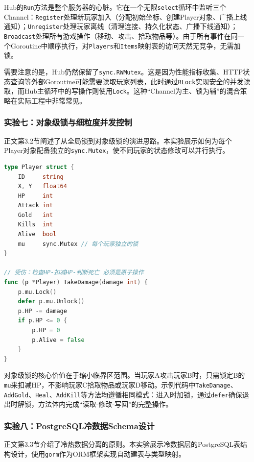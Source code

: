 Hub的\texttt{Run}方法是整个服务器的心脏。它在一个无限\texttt{select}循环中监听三个Channel：\texttt{Register}处理新玩家加入（分配初始坐标、创建Player对象、广播上线通知）；\texttt{Unregister}处理玩家离线（清理连接、持久化状态、广播下线通知）；\texttt{Broadcast}处理所有游戏操作（移动、攻击、拾取物品等）。由于所有事件在同一个Goroutine中顺序执行，对\texttt{Players}和\texttt{Items}映射表的访问天然无竞争，无需加锁。

需要注意的是，Hub仍然保留了\texttt{sync.RWMutex}。这是因为性能指标收集、HTTP状态查询等外部Goroutine可能需要读取玩家列表，此时通过\texttt{RLock}实现安全的并发读取，而Hub主循环中的写操作则使用\texttt{Lock}。这种``Channel为主、锁为辅''的混合策略在实际工程中非常常见。

\subsubsection{实验七：对象级锁与细粒度并发控制}

正文第3.2节阐述了从全局锁到对象级锁的演进思路。本实验展示如何为每个Player对象配备独立的\texttt{sync.Mutex}，使不同玩家的状态修改可以并行执行。

\begin{tcolorbox}[title=Player对象级锁设计]
\begin{lstlisting}[style=codeblock, language=go]
type Player struct {
    ID     string
    X, Y   float64
    HP     int
    Attack int
    Gold   int
    Kills  int
    Alive  bool
    mu     sync.Mutex // 每个玩家独立的锁
}

// 受伤：检查HP-扣减HP-判断死亡 必须是原子操作
func (p *Player) TakeDamage(damage int) {
    p.mu.Lock()
    defer p.mu.Unlock()
    p.HP -= damage
    if p.HP <= 0 {
        p.HP = 0
        p.Alive = false
    }
}
\end{lstlisting}
\end{tcolorbox}

对象级锁的核心价值在于缩小临界区范围。当玩家A攻击玩家B时，只需锁定B的\texttt{mu}来扣减HP，不影响玩家C拾取物品或玩家D移动。示例代码中\texttt{TakeDamage}、\texttt{AddGold}、\texttt{Heal}、\texttt{AddKill}等方法均遵循相同模式：进入时加锁，通过\texttt{defer}确保退出时解锁，方法体内完成``读取-修改-写回''的完整操作。

\subsubsection{实验八：PostgreSQL冷数据Schema设计}

正文第3.3节介绍了冷热数据分离的原则。本实验展示冷数据层的PostgreSQL表结构设计，使用\texttt{gorm}作为ORM框架实现自动建表与类型映射。

